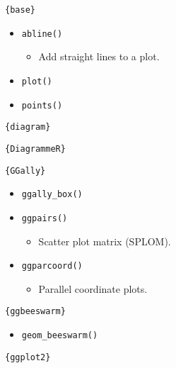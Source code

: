 \documentclass[
]{book}
\providecommand{\tightlist}{%
  \setlength{\itemsep}{0pt}\setlength{\parskip}{0pt}}
\begin{document}
\texttt{\{base\}}

\begin{itemize}
\tightlist
\item
  \texttt{abline()}

  \begin{itemize}
  \tightlist
  \item
    Add straight lines to a plot.
  \end{itemize}
\item
  \texttt{plot()}
\item
  \texttt{points()}
\end{itemize}

\texttt{\{diagram\}}

\texttt{\{DiagrammeR\}}

\texttt{\{GGally\}}

\begin{itemize}
\tightlist
\item
  \texttt{ggally\_box()}
\item
  \texttt{ggpairs()}

  \begin{itemize}
  \tightlist
  \item
    Scatter plot matrix (SPLOM).
  \end{itemize}
\item
  \texttt{ggparcoord()}

  \begin{itemize}
  \tightlist
  \item
    Parallel coordinate plots.
  \end{itemize}
\end{itemize}

\texttt{\{ggbeeswarm\}}

\begin{itemize}
\tightlist
\item
  \texttt{geom\_beeswarm()}
\end{itemize}

\texttt{\{ggplot2\}}
\end{document}
